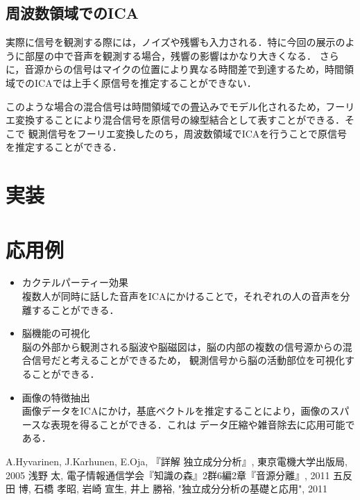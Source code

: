 \documentclass{jarticle}
\begin{document}
\subsection{周波数領域でのICA}
実際に信号を観測する際には，ノイズや残響も入力される．特に今回の展示のように部屋の中で音声を観測する場合，残響の影響はかなり大きくなる．
さらに，音源からの信号はマイクの位置により異なる時間差で到達するため，時間領域でのICAでは上手く原信号を推定することができない．\par
このような場合の混合信号は時間領域での畳込みでモデル化されるため，フーリエ変換することにより混合信号を原信号の線型結合として表すことができる．そこで
観測信号をフーリエ変換したのち，周波数領域でICAを行うことで原信号を推定することができる．

\section{実装}


\section{応用例}
\begin{itemize}
  \setlength{\parskip}{0cm}
  \setlength{\itemsep}{0cm}
  \item カクテルパーティー効果\\
  複数人が同時に話した音声をICAにかけることで，それぞれの人の音声を分離することができる．
  \item 脳機能の可視化\\
  脳の外部から観測される脳波や脳磁図は，脳の内部の複数の信号源からの混合信号だと考えることができるため，
  観測信号から脳の活動部位を可視化することができる．
  \item 画像の特徴抽出\\
  画像データをICAにかけ，基底ベクトルを推定することにより，画像のスパースな表現を得ることができる．これは
  データ圧縮や雑音除去に応用可能である．

\end{itemize}

\begin{thebibliography}{9}
   A.Hyvarinen, J.Karhunen, E.Oja, 『詳解 独立成分分析』, 東京電機大学出版局, 2005
   浅野 太, 電子情報通信学会『知識の森』2群6編2章『音源分離』, 2011
   五反田 博, 石橋 孝昭, 岩崎 宣生, 井上 勝裕, "独立成分分析の基礎と応用", 2011
\end{thebibliography}
\end{document}
